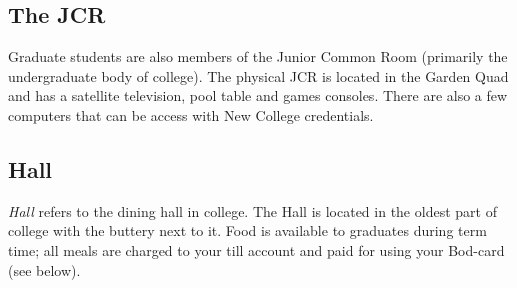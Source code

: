 \subsection{The JCR}

Graduate students are also members of the Junior Common Room (primarily the undergraduate body of college). The physical JCR is located in the Garden Quad and has a satellite television, pool table and games consoles. There are also a few computers that can be access with New College credentials.
\subsection{Hall}

\emph{Hall} refers to the dining hall in college. The Hall is located in the oldest
part of college with the buttery next to it. Food is available to graduates during term time; all meals are charged to your till account and paid for using your Bod-card (see below). 

\smallskip

